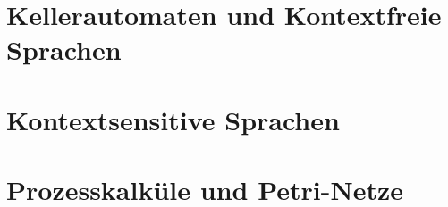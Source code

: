 \documentclass[11pt, a4paper]{article}
\theoremstyle{definition}
\theoremstyle{plain}
\numberwithin{equation}{section}
\begin{document}
\section{Kellerautomaten und Kontextfreie Sprachen}\label{sec:contextfree}

\newpage
\section{Kontextsensitive Sprachen}\label{sec:contextsensitive}

\newpage
\section{Prozesskalküle und Petri-Netze}\label{sec:process}

\newpage
{}


\end{document}
